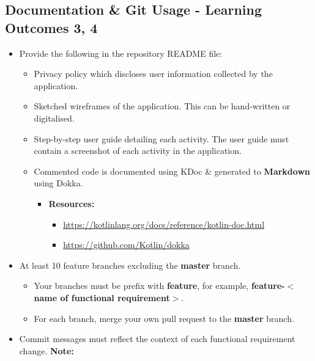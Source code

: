 \documentclass{article}
\begin{document}
\subsection*{Documentation \& Git Usage - Learning Outcomes 3, 4}
\begin{itemize}
    \item Provide the following in the repository README file:
    \begin{itemize}
        \item Privacy policy which discloses user information collected by the application.
        \item Sketched wireframes of the application. This can be hand-written or digitalised.
        \item Step-by-step user guide detailing each activity. The user guide must contain a screenshot of each activity in the application.
        \item Commented code is documented using KDoc \& generated to \textbf{Markdown} using Dokka.
        \begin{itemize}
            \item \textbf{Resources:}
            \begin{itemize}
                \item \footnotesize\href{https://kotlinlang.org/docs/reference/kotlin-doc.html}{https://kotlinlang.org/docs/reference/kotlin-doc.html}
                \item \footnotesize\href{https://github.com/Kotlin/dokka}{https://github.com/Kotlin/dokka}
            \end{itemize}
        \end{itemize} 
    \end{itemize}
    \item At least 10 feature branches excluding the \textbf{master} branch.
    \begin{itemize}
        \item Your branches must be prefix with \textbf{feature}, for example, \textbf{feature-$<$name of functional requirement$>$}.
        \item For each branch, merge your own pull request to the \textbf{master} branch.
    \end{itemize}
    \item Commit messages must reflect the context of each functional requirement change. \textbf{Note:} 
\end{itemize}
\end{document}
